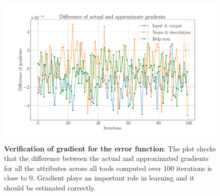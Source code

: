 \begin{figure}[h]
\begin{centering}
    {\includegraphics[scale=0.35]{figures/Difference_gradients.pdf}}
    \caption[Verification of gradient for the error function]{\textbf{Verification of gradient for the error function}: The plot checks that the difference between the actual and approximated gradients for all the attributes across all tools computed over 100 iterations is close to 0. Gradient plays an important role in learning and it should be estimated correctly. }
\end{centering}
\end{figure}
